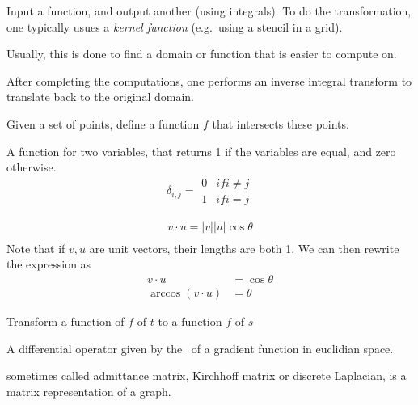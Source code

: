 \begin{definition}\label{inttrans}
    Input a function, and output another (using integrals).
    To do the transformation, one typically usues a \textit{kernel function} (e.g.\ 
    using a stencil in a grid).

    Usually, this is done to find a domain or function that is easier to compute
    on. 

    After completing the computations, one performs an inverse integral transform
    to translate back to the original domain.
\end{definition}

\begin{definition}
    Given a set of points, define a function $f$ that intersects these points.
\end{definition}

\begin{definition}
    A function for two variables, that returns 1 if the variables are equal,
    and zero otherwise.
    $$
    \delta_{i,j} = \begin{array}{ll}
        0 & if i \neq j \\
        1 & if i = j
        \end{array}
    $$
\end{definition}

\begin{definition}
    \begin{align*}
        v \cdot u = |v||u|\cos{\theta} \\
    \end{align*}
    Note that if $v, u$ are unit vectors, their lengths are both 1.
    We can then rewrite the expression as
    \begin{align*}
        v \cdot u &= \cos{\theta} \\
        \arccos{(v \cdot u)} &= \theta
    \end{align*}
\end{definition}

\begin{definition}
    Transform a function of $f$ of $t$ to a function $f$ of $s$

    A differential operator given by the~ of a gradient 
    function in euclidian space.
\end{definition}

\begin{definition}
    sometimes called admittance matrix, Kirchhoff matrix or discrete Laplacian,
    is a matrix representation of a graph.

\end{definition}

